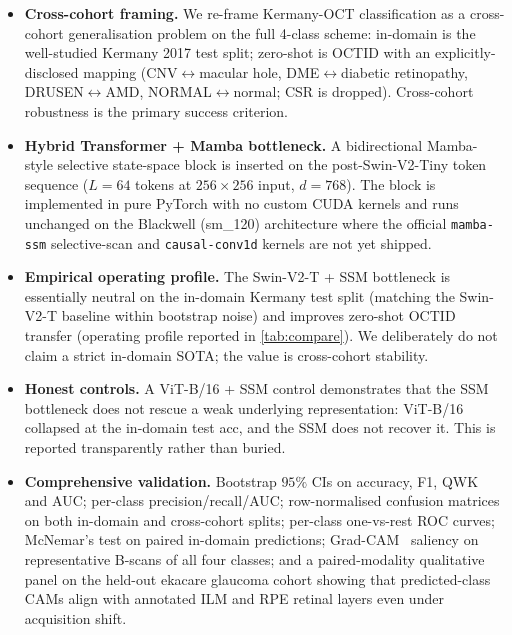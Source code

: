 \documentclass[5p]{elsarticle}
\begin{document}
\begin{itemize}\setlength\itemsep{2pt}
\item \textbf{Cross-cohort framing.} We re-frame Kermany-OCT classification as a cross-cohort generalisation problem on the full 4-class scheme: in-domain is the well-studied Kermany 2017 test split; zero-shot is OCTID with an explicitly-disclosed mapping (CNV$\leftrightarrow$macular hole, DME$\leftrightarrow$diabetic retinopathy, DRUSEN$\leftrightarrow$AMD, NORMAL$\leftrightarrow$normal; CSR is dropped). Cross-cohort robustness is the primary success criterion.
\item \textbf{Hybrid Transformer + Mamba bottleneck.} A bidirectional Mamba-style selective state-space block is inserted on the post-Swin-V2-Tiny token sequence ($L=64$ tokens at $256\times256$ input, $d=768$). The block is implemented in pure PyTorch with no custom CUDA kernels and runs unchanged on the Blackwell (sm\_120) architecture where the official \texttt{mamba-ssm} selective-scan and \texttt{causal-conv1d} kernels are not yet shipped.
\item \textbf{Empirical operating profile.} The Swin-V2-T + SSM bottleneck is essentially neutral on the in-domain Kermany test split (matching the Swin-V2-T baseline within bootstrap noise) and improves zero-shot OCTID transfer (operating profile reported in \cref{tab:compare}). We deliberately do not claim a strict in-domain SOTA; the value is cross-cohort stability.
\item \textbf{Honest controls.} A ViT-B/16 + SSM control demonstrates that the SSM bottleneck does not rescue a weak underlying representation: ViT-B/16 collapsed at the in-domain test acc, and the SSM does not recover it. This is reported transparently rather than buried.
\item \textbf{Comprehensive validation.} Bootstrap $95\%$ CIs on accuracy, F1, QWK and AUC; per-class precision/recall/AUC; row-normalised confusion matrices on both in-domain and cross-cohort splits; per-class one-vs-rest ROC curves; McNemar's test on paired in-domain predictions; Grad-CAM~\citep{selvaraju2017} saliency on representative B-scans of all four classes; and a paired-modality qualitative panel on the held-out ekacare glaucoma cohort showing that predicted-class CAMs align with annotated ILM and RPE retinal layers even under acquisition shift.
\end{itemize}


\end{document}

